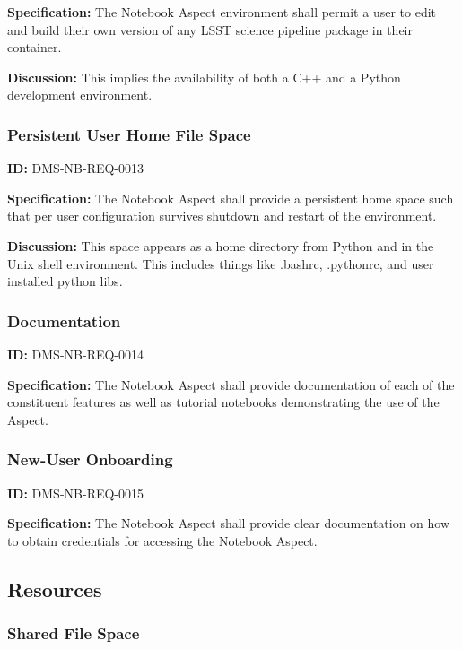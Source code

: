 \documentclass[SE,toc,lsstdraft]{lsstdoc}
\begin{document}
\textbf{Specification:}
The Notebook Aspect environment shall permit a user to edit and build their own version of any LSST science pipeline package in their container.

\textbf{Discussion:}
This implies the availability of both a C++ and a Python development environment.

\subsubsection{Persistent User Home File Space}

\label{DMS-NB-REQ-0013}
\textbf{ID:} DMS-NB-REQ-0013

\textbf{Specification:}
The Notebook Aspect shall provide a persistent home space such that per user configuration survives shutdown and restart of the environment.

\textbf{Discussion:}
This space appears as a home directory from Python and in the Unix shell environment. This includes things like .bashrc, .pythonrc, and user installed python libs.

\subsubsection{Documentation}

\label{DMS-NB-REQ-0014}
\textbf{ID:} DMS-NB-REQ-0014

\textbf{Specification:}
The Notebook Aspect shall provide documentation of each of the constituent features as well as tutorial notebooks demonstrating the use of the Aspect.

\subsubsection{New-User Onboarding}

\label{DMS-NB-REQ-0015}
\textbf{ID:} DMS-NB-REQ-0015

\textbf{Specification:}
The Notebook Aspect shall provide clear documentation on how to obtain credentials for accessing the Notebook Aspect.

\subsection{Resources}

\subsubsection{Shared File Space}
\end{document}
